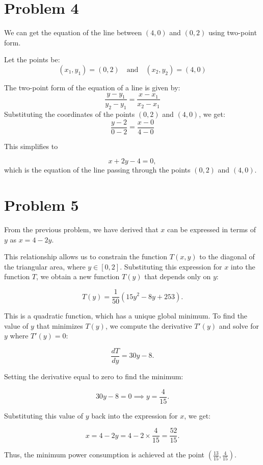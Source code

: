 \documentclass[12pt,a4paper]{article}
\begin{document}
\section*{Problem 4}
\begin{solution}
We can get the equation of the line between $(4, 0)$ and $(0, 2)$ using two-point form.

Let the points be:
\[
(x_1, y_1) = (0, 2) \quad \text{and} \quad (x_2, y_2) = (4, 0)
\]

The two-point form of the equation of a line is given by:
\[
\frac{y - y_1}{y_2 - y_1} = \frac{x - x_1}{x_2 - x_1}
\]
Substituting the coordinates of the points \((0, 2)\) and \((4, 0)\), we get:
\[
\frac{y - 2}{0 - 2} = \frac{x - 0}{4 - 0}
\]

This simplifies to

\[
x+2y-4=0,
\]
which is the equation of the line passing through the points \((0, 2)\) and \((4, 0)\).

\end{solution}

\section*{Problem 5}
\begin{solution}

From the previous problem, we have derived that \( x \) can be expressed in terms of \( y \) as \( x = 4 - 2y \).

This relationship allows us to constrain the function \( T(x, y) \) to the diagonal of the triangular area, where \( y \in [0, 2] \). Substituting this expression for \( x \) into the function \( T \), we obtain a new function \( T(y) \) that depends only on \( y \):

\[
T(y) = \frac{1}{50} \left(15y^2 - 8y + 253\right).
\]

This is a quadratic function, which has a unique global minimum. To find the value of \( y \) that minimizes \( T(y) \), we compute the derivative \( T'(y) \) and solve for \( y \) where \( T'(y) = 0 \):

\[
\frac{dT}{dy} = 30y - 8.
\]

Setting the derivative equal to zero to find the minimum:

\[
30y - 8 = 0 \implies y = \frac{4}{15}.
\]

Substituting this value of \( y \) back into the expression for \( x \), we get:

\[
x = 4 - 2y = 4 - 2 \times \frac{4}{15} = \frac{52}{15}.
\]

Thus, the minimum power consumption is achieved at the point \( \left(\frac{13}{15}, \frac{4}{15}\right) \).

\end{solution}
\end{document}
